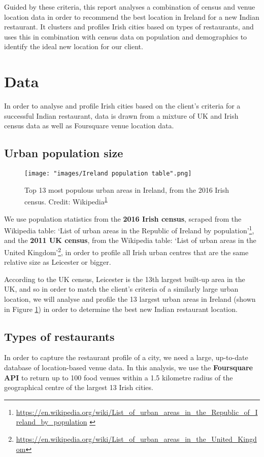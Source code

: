 \documentclass[a4paper,11pt]{article}
\begin{document}
Guided by these criteria, this report analyses a combination of census and venue location data in order to recommend the best location in Ireland for a new Indian restaurant. It clusters and profiles Irish cities based on types of restaurants, and uses this in combination with census data on population and demographics to identify the ideal new location for our client.

\section{Data}
In order to analyse and profile Irish cities based on the client's criteria for a successful Indian restaurant, data is drawn from a mixture of UK and Irish census data as well as Foursquare venue location data.

\subsection{Urban population size}
\begin{figure}[htb]
   \centering
   \texttt{[image: "images/Ireland population table".png]}
      \caption{Top 13 most populous urban areas in Ireland, from the 2016 Irish census. Credit: Wikipedia\textsuperscript{\ref{footnote:irish pop}}}
      \label{fig:irish pop table}
\end{figure}
We use population statistics from the \textbf{2016 Irish census}, scraped from the Wikipedia table: `List of urban areas in the Republic of Ireland by population'\footnote{\url{https://en.wikipedia.org/wiki/List_of_urban_areas_in_the_Republic_of_Ireland_by_population} \label{footnote:irish pop}}, and the \textbf{2011 UK census}, from the Wikipedia table: `List of urban areas in the United Kingdom'\footnote{\url{https://en.wikipedia.org/wiki/List_of_urban_areas_in_the_United_Kingdom}}, in order to profile all Irish urban centres that are the same relative size as Leicester or bigger.

According to the UK census, Leicester is the 13th largest built-up area in the UK, and so in order to match the client's criteria of a similarly large urban location, we will analyse and profile the 13 largest urban areas in Ireland (shown in Figure \ref{fig:irish pop table}) in order to determine the best new Indian restaurant location.

\subsection{Types of restaurants}
In order to capture the restaurant profile of a city, we need a large, up-to-date database of location-based venue data. In this analysis, we use the \textbf{Foursquare API} to return up to 100 food venues within a 1.5 kilometre radius of the geographical centre of the largest 13 Irish cities.
\end{document}
